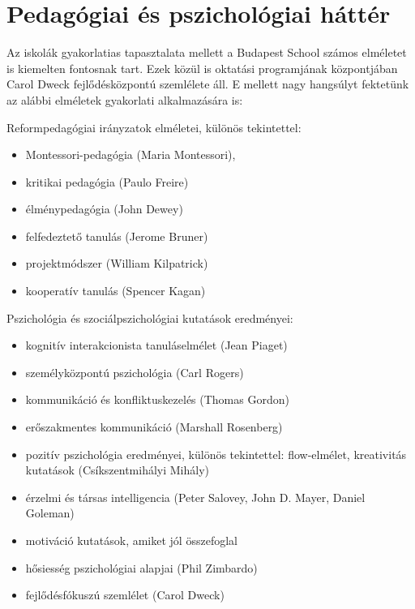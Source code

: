 \section{Pedagógiai és pszichológiai háttér}

Az iskolák gyakorlatias tapasztalata mellett a Budapest School számos elméletet is kiemelten fontosnak tart. Ezek közül is oktatási programjának központjában Carol Dweck fejlődésközpontú szemlélete \citep{growthmindset} áll. E mellett nagy hangsúlyt fektetünk az alábbi elméletek gyakorlati alkalmazására is:

Reformpedagógiai irányzatok elméletei, különös tekintettel:

\begin{itemize}

      \item
            Montessori-pedagógia (Maria Montessori),
      \item
            kritikai pedagógia (Paulo Freire)
      \item
            élménypedagógia (John Dewey)
      \item
            felfedeztető tanulás (Jerome Bruner)
      \item
            projektmódszer (William Kilpatrick)
      \item
            kooperatív tanulás (Spencer Kagan)
\end{itemize}

Pszichológia és szociálpszichológiai kutatások eredményei:

\begin{itemize}

      \item
            kognitív interakcionista tanuláselmélet (Jean Piaget)
      \item
            személyközpontú pszichológia (Carl Rogers)
      \item
            kommunikáció és konfliktuskezelés (Thomas Gordon)
      \item
            erőszakmentes kommunikáció (Marshall Rosenberg)
      \item
            pozitív pszichológia eredményei, különös tekintettel: flow-elmélet, kreativitás kutatások (Csík\-szent\-mihályi Mihály)
      \item
            érzelmi és társas intelligencia (Peter Salovey, John D. Mayer, Daniel Goleman)
      \item motiváció kutatások, amiket jól összefoglal \citep{pink2011drive}
      \item
            hősiesség pszichológiai alapjai (Phil Zimbardo)
      \item
            fejlődésfókuszú szemlélet (Carol Dweck)
\end{itemize}